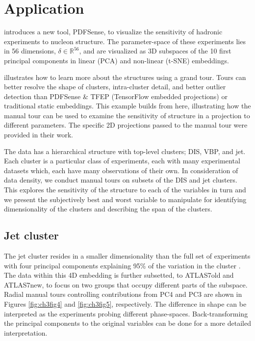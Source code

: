 \documentclass{template/monashthesis}
\begin{document}
\hypertarget{sec:application}{%
\section{Application}\label{sec:application}}

\textcite{wang_mapping_2018} introduces a new tool, PDFSense, to visualize the sensitivity of hadronic experiments to nucleon structure. The parameter-space of these experiments lies in 56 dimensions, \(\delta \in \mathbb{R}^{56}\), and are visualized as 3D subspaces of the 10 first principal components in linear (PCA) and non-linear (t-SNE) embeddings.

\textcite{cook_dynamical_2018} illustrates how to learn more about the structures using a grand tour. Tours can better resolve the shape of clusters, intra-cluster detail, and better outlier detection than PDFSense \& TFEP (TensorFlow embedded projections) or traditional static embeddings. This example builds from here, illustrating how the manual tour can be used to examine the sensitivity of structure in a projection to different parameters. The specific 2D projections passed to the manual tour were provided in their work.

The data has a hierarchical structure with top-level clusters; DIS, VBP, and jet. Each cluster is a particular class of experiments, each with many experimental datasets which, each have many observations of their own. In consideration of data density, we conduct manual tours on subsets of the DIS and jet clusters. This explores the sensitivity of the structure to each of the variables in turn and we present the subjectively best and worst variable to manipulate for identifying dimensionality of the clusters and describing the span of the clusters.

\hypertarget{jet-cluster}{%
\subsection{Jet cluster}\label{jet-cluster}}

The jet cluster resides in a smaller dimensionality than the full set of experiments with four principal components explaining 95\% of the variation in the cluster \autocite{cook_dynamical_2018}. The data within this 4D embedding is further subsetted, to ATLAS7old and ATLAS7new, to focus on two groups that occupy different parts of the subspace. Radial manual tours controlling contributions from PC4 and PC3 are shown in Figures \ref{fig:ch3fig4} and \ref{fig:ch3fig5}, respectively. The difference in shape can be interpreted as the experiments probing different phase-spaces. Back-transforming the principal components to the original variables can be done for a more detailed interpretation.
\end{document}
